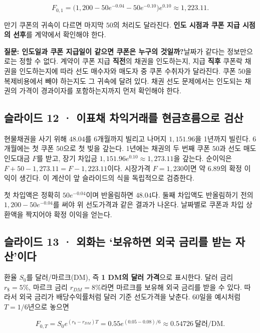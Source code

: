 \documentclass[11pt,a4paper]{article}
\begin{document}
\[
F_{0,1}=\bigl(1{,}200-50e^{-0.04}-50e^{-0.10}\bigr)e^{0.10}
\approx1{,}223.11.
\]

만기 쿠폰의 귀속이 다르면 마지막 $50$의 처리도 달라진다. \textbf{인도 시점과 쿠폰 지급 시점의 선후}를 계약에서 확인해야 한다.\par

\par\medskip\noindent\textbf{질문: 인도일과 쿠폰 지급일이 같으면 쿠폰은 누구의 것일까?}\quad 날짜가 같다는 정보만으로는 정할 수 없다. 계약이 쿠폰 지급 \textbf{직전}의 채권을 인도하는지, 지급 \textbf{직후} 쿠폰락 채권을 인도하는지에 따라 선도 매수자와 매도자 중 쿠폰 수취자가 달라진다. 쿠폰 50을 복제비용에서 빼야 하는지도 그 귀속에 달려 있다. 채권 선도 문제에서는 인도되는 채권의 가격이 경과이자를 포함하는지까지 먼저 확인해야 한다.\par

\subsection{슬라이드 12 · 이표채 차익거래를 현금흐름으로 검산}
현물채권을 사기 위해 $48.04$를 6개월까지 빌리고 나머지 $1,151.96$을 1년까지 빌린다. 6개월에는 첫 쿠폰 $50$으로 첫 빚을 갚는다. 1년에는 채권의 두 번째 쿠폰 $50$과 선도 매도 인도대금 $F$를 받고, 장기 차입금 $1,151.96e^{0.10}\approx1,273.11$을 갚는다. 순이익은 $F+50-1,273.11=F-1,223.11$이다. 시장가격 $F=1,230$이면 약 $6.89$의 확정 이익이 생긴다. 이 계산이 앞 슬라이드의 식을 독립적으로 검증한다.\par

첫 차입액은 정확히 $50e^{-0.04}$이며 반올림하면 $48.04$다. 둘째 차입액도 반올림하기 전의 $1{,}200-50e^{-0.04}$를 써야 위 선도가격과 같은 결과가 나온다. 날짜별로 쿠폰과 차입 상환액을 짝지어야 확정 이익을 얻는다.\par

\subsection{슬라이드 13 · 외화는 ‘보유하면 외국 금리를 받는 자산’이다}
환율 $S_0$를 달러/마르크(DM), 즉 \textbf{1 DM의 달러 가격}으로 표시한다. 달러 금리 $r_{\$}=5\%$, 마르크 금리 $r_{DM}=8\%$라면 마르크를 보유해 외국 금리를 받을 수 있다. 따라서 외국 금리가 배당수익률처럼 달러 기준 선도가격을 낮춘다. 60일을 예시처럼 $T=1/6$년으로 놓으면\par

\[
F_{0,T}=S_0e^{(r_{\$}-r_{DM})T}
=0.55e^{(0.05-0.08)/6}\approx0.54726\ \text{달러/DM}.
\]
\end{document}
